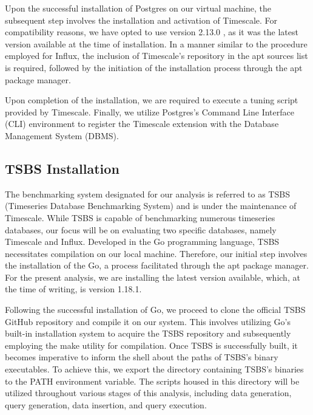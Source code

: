 \documentclass[conference]{IEEEtran}
\begin{document}
Upon the successful installation of Postgres on our virtual machine, the subsequent step involves the installation and activation of Timescale. For compatibility reasons, we have opted to use version 2.13.0 \cite{b4}, as it was the latest version available at the time of installation. In a manner similar to the procedure employed for Influx, the inclusion of Timescale's repository in the apt sources list is required, followed by the initiation of the installation process through the apt package manager. 

Upon completion of the installation, we are required to execute a tuning script provided by Timescale. Finally, we utilize Postgres's Command Line Interface (CLI) environment to register the Timescale extension with the Database Management System (DBMS).

\subsection{TSBS Installation}
The benchmarking system designated for our analysis is referred to as TSBS (Timeseries Database Benchmarking System) and is under the maintenance of Timescale. While TSBS is capable of benchmarking numerous timeseries databases, our focus will be on evaluating two specific databases, namely Timescale and Influx. Developed in the Go programming language, TSBS necessitates compilation on our local machine. Therefore, our initial step involves the installation of the Go, a process facilitated through the apt package manager. For the present analysis, we are installing the latest version available, which, at the time of writing, is version 1.18.1.

Following the successful installation of Go, we proceed to clone the official TSBS GitHub repository \cite{b1} and compile it on our system. This involves utilizing Go's built-in installation system to acquire the TSBS repository and subsequently employing the make utility for compilation. Once TSBS is successfully built, it becomes imperative to inform the shell about the paths of TSBS's binary executables. To achieve this, we export the directory containing TSBS's binaries to the PATH environment variable. The scripts housed in this directory will be utilized throughout various stages of this analysis, including data generation, query generation, data insertion, and query execution.
\end{document}
